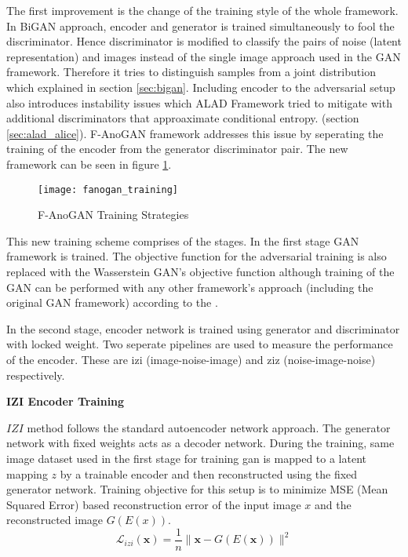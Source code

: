 The first improvement is the change of the training style of the whole framework. In BiGAN approach,
encoder and generator is trained simultaneously to fool the discriminator. Hence discriminator is
modified to classify the pairs of noise (latent representation) and images instead of the single
image approach used in the GAN framework. Therefore it tries to distinguish samples from a joint
distribution which explained in section \ref{sec:bigan}. Including encoder to the adversarial setup
also introduces instability issues which ALAD Framework \cite{DBLP:journals/corr/abs-1812-02288}
tried to mitigate with additional discriminators that approaximate conditional entropy. (section
\ref{sec:alad_alice}). F-AnoGAN framework addresses this issue by seperating the training of the
encoder from the generator discriminator pair. The new framework can be seen in figure
\ref{fig:fanogan_training}. 
\begin{figure}[h!]
	\centering
	\texttt{[image: fanogan\_training]}
	\caption{F-AnoGAN Training Strategies \cite{pub.1111824956}}
	\label{fig:fanogan_training}
\end{figure}

This new training scheme comprises of the stages. In the first stage GAN framework is trained. The
objective function for the adversarial training is also replaced with the Wasserstein GAN's
objective function \cite{Arjovsky2017WassersteinG} 
although training of the GAN can be performed with any other framework's approach (including the
original GAN framework) according to the \cite{pub.1111824956}.

In the second stage, encoder network is trained using generator and discriminator with locked
weight. Two seperate pipelines are used to measure the performance of the encoder. These are izi
(image-noise-image) and ziz (noise-image-noise) respectively. 

\textbf{IZI Encoder Training}

$IZI$ method follows the standard autoencoder network approach. The generator network with fixed
weights acts as a decoder network. During the training, same image dataset used in the first stage
for training gan is mapped to a latent mapping $z$ by a trainable encoder and then reconstructed
using the fixed generator network. Training objective for this setup is to minimize MSE (Mean
Squared Error) based reconstruction error of the input image $x$ and the reconstructed image
$G(E(x))$. 
\begin{equation}
	\mathcal{L}_{i z i}(\mathbf{x})=\frac{1}{n}\|\mathbf{x}-G(E(\mathbf{x}))\|^{2}
\end{equation}

